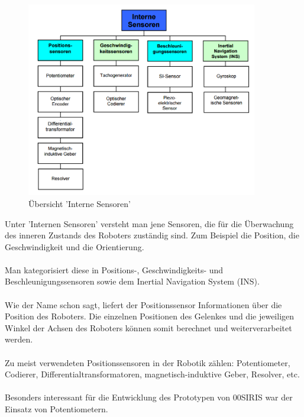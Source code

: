 \documentclass[11pt, a4paper]{article}
\begin{document}
\newpage
\begin{figure}[h!]
		\centering
		\includegraphics[width=0.9\textwidth]{graphics/sensors/interne-sensoren}
		\caption{\"Ubersicht 'Interne Sensoren'{\cite{robot-sensors}}}
\end{figure} 
\noindent Unter 'Internen Sensoren' versteht man jene Sensoren, die f\"ur die \"Uberwachung des inneren Zustands des Roboters zust\"andig sind. Zum Beispiel die Position, die Geschwindigkeit und die
Orientierung. \\ \\
Man kategorisiert diese in Positions-, Geschwindigkeits- und Beschleunigungssensoren sowie dem Inertial Navigation System (INS). \\ \\
Wie der Name schon sagt, liefert der Positionssensor Informationen \"uber die Position des Roboters.
Die einzelnen Positionen des Gelenkes und die jeweiligen Winkel der Achsen des Roboters k\"onnen
somit berechnet und weiterverarbeitet werden. \\ \\
Zu meist verwendeten Positionssensoren in der Robotik z\"ahlen: Potentiometer, Codierer,
Differentialtransformatoren, magnetisch-induktive Geber, Resolver, etc. \\ \\
Besonders interessant f\"ur die Entwicklung des Prototypen von 00SIRIS war der Einsatz von
Potentiometern.
\newpage
\end{document}
